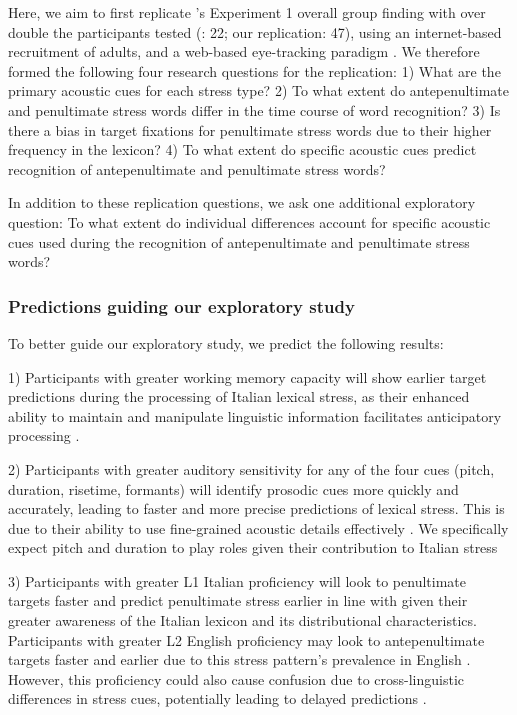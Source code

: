 Here, we aim to first replicate \cite{Sulpizio_McQueen_2012}'s Experiment 1 overall group finding with over double the participants tested (\cite{Sulpizio_McQueen_2012}: 22; our replication: 47), using an internet-based recruitment of adults, and a web-based eye-tracking paradigm \citep{Vos_2017}. We therefore formed the following four research questions for the replication: 1) What are the primary acoustic cues for each stress type? 2) To what extent do antepenultimate and penultimate stress words differ in the time course of word recognition? 3) Is there a bias in target fixations for penultimate stress words due to their higher frequency in the lexicon? 4) To what extent do specific acoustic cues predict recognition of antepenultimate and penultimate stress words? 

In addition to these replication questions, we ask one additional exploratory question: To what extent do individual differences account for specific acoustic cues used during the recognition of antepenultimate and penultimate stress words?

\subsubsection{Predictions guiding our exploratory study}
To better guide our exploratory study, we predict the following results: 

1) Participants with greater working memory capacity will show earlier target predictions during the processing of Italian lexical stress, as their enhanced ability to maintain and manipulate linguistic information facilitates anticipatory processing \citep{Traxler2009, Huettig2016}.

2) Participants with greater auditory sensitivity for any of the four cues (pitch, duration, risetime, formants) will identify prosodic cues more quickly and accurately, leading to faster and more precise predictions of lexical stress. This is due to their ability to use fine-grained acoustic details effectively \citep{nan_2010, goss_2014,mcmurray_2008}. We specifically expect pitch and duration to play roles given their contribution to Italian stress \citep{Tagliapietra2005, Alfano2006,Alfano2009}

3) Participants with greater L1 Italian proficiency will look to penultimate targets faster and predict penultimate stress earlier in line with \cite{Sulpizio_McQueen_2012} given their greater awareness of the Italian lexicon and its distributional characteristics. Participants with greater L2 English proficiency may look to antepenultimate targets faster and earlier due to this stress pattern's prevalence in English \citep{cutler2007dutch}. However, this proficiency could also cause confusion due to cross-linguistic differences in stress cues, potentially leading to delayed predictions \citep{primativo2013bilingual}. 

